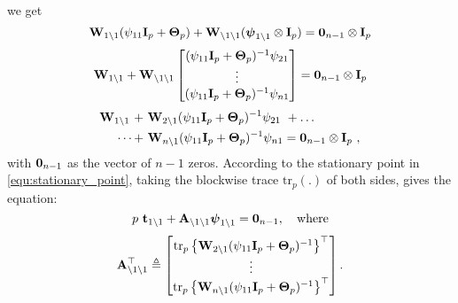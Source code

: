     we get
    \begin{equation*}
      \nonumber \mathbf{W}_{1\setminus1} (\psi_{11}\mathbf{I}_p + \mathbf{\Theta}_p) + \mathbf{W}_{\setminus1\setminus1} (\boldsymbol{\psi}_{1\setminus1} \otimes \mathbf{I}_p) = \mathbf{0}_{n-1} \otimes \mathbf{I}_p
    \end{equation*}
    \begin{equation} \label{equ:W1_not1}
      \mathbf{W}_{1\setminus1} + \mathbf{W}_{\setminus1\setminus1}\begin{bmatrix}  (\psi_{11}\mathbf{I}_p + \mathbf{\Theta}_p)^{-1} \psi_{21} \\ \vdots \\ (\psi_{11}\mathbf{I}_p + \mathbf{\Theta}_p)^{-1}\psi_{n1} \end{bmatrix} = \mathbf{0}_{n-1} \otimes \mathbf{I}_p
    \end{equation}
    \begin{equation}
      \begin{split}
        \nonumber \mathbf{W}_{1\setminus1} ~+~ &\mathbf{W}_{2\setminus1} (\psi_{11}\mathbf{I}_p + \mathbf{\Theta}_p)^{-1} \psi_{21} ~+\dots~\\
        ~\dots+~  &\mathbf{W}_{n\setminus1} (\psi_{11}\mathbf{I}_p + \mathbf{\Theta}_p)^{-1} \psi_{n1} = \mathbf{0}_{n-1} \otimes \mathbf{I}_p ~,
      \end{split}
    \end{equation}
    with $\mathbf{0}_{n-1}$  as the vector of $n-1$ zeros. According to the stationary point in \eqref{equ:stationary_point}, taking the blockwise trace $\textrm{tr}_p(.)$ of both sides, gives the equation:
    \begin{equation*}
      p ~ \mathbf{t}_{1\setminus1} + \mathbf{A}_{\setminus 1 \setminus1} \boldsymbol{\psi}_{1\setminus1} = \mathbf{0}_{n-1},\quad \textrm{where}\\
    \end{equation*}
    \begin{equation}
      \mathbf{A}^\top_{\setminus 1 \setminus1} \triangleq \begin{bmatrix}  \textrm{tr}_p \left\{ \mathbf{W}_{2\setminus1} (\psi_{11}\mathbf{I}_p + \mathbf{\Theta}_p)^{-1} \right\}^\top \\ \vdots \\ \textrm{tr}_p \left\{ \mathbf{W}_{n\setminus1} (\psi_{11}\mathbf{I}_p + \mathbf{\Theta}_p)^{-1} \right\}^\top  \end{bmatrix}.
    \end{equation}
    
